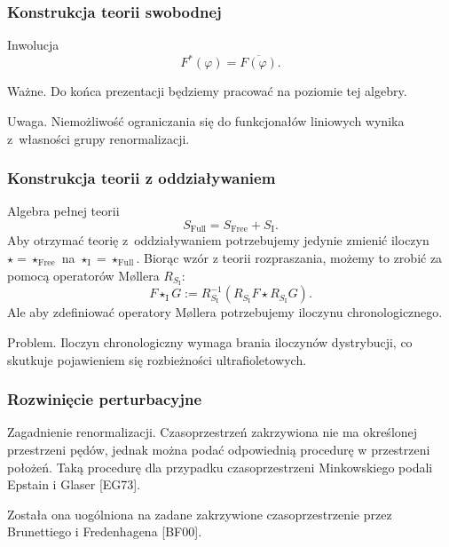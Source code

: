 \documentclass[10pt,t]{beamer}
\begin{document}
\begin{frame}
  \frametitle{Konstrukcja teorii swobodnej}


  Inwolucja
  \begin{equation}
    \label{eq:Rachunek-zaburzen-14}
    F^{ * }( \varphi ) = \overline{ F( \varphi ) }.
  \end{equation}

  Ważne. Do końca prezentacji będziemy pracować na poziomie tej algebry.

  Uwaga. Niemożliwość ograniczania się do funkcjonałów liniowych wynika
  z~własności grupy renormalizacji.

\end{frame}





\begin{frame}
  \frametitle{Konstrukcja teorii z oddziaływaniem}


  Algebra pełnej teorii
  \begin{equation}
    \label{eq:Rachunek-zaburzen-15}
    S_{ \textrm{Full} } = S_{ \textrm{Free} } + S_{ \textrm{I} }.
  \end{equation}
  Aby otrzymać teorię z~oddziaływaniem potrzebujemy jedynie zmienić
  iloczyn $\star = \star_{ \textrm{Free} }$ na
  $\star_{ \textrm{I} } = \star_{ \textrm{Full} }$. Biorąc wzór z teorii rozpraszania,
  możemy to zrobić za pomocą operatorów M\o llera $R_{ S_{ \textrm{I} } }$:
  \begin{equation}
    \label{eq:Rachunek-zaburzen-16}
    F \star_{ \textrm{I} } G :=
    R_{ S_{ \textrm{I} } }^{ -1 }( R_{ S_{ \textrm{I} } } F
    \star R_{ S_{ \textrm{I} } } G ).
  \end{equation}
  Ale aby zdefiniować operatory M\o llera potrzebujemy iloczynu
  chronologicznego.

  Problem. Iloczyn chronologiczny wymaga brania iloczynów dystrybucji,
  co skutkuje pojawieniem się rozbieżności ultrafioletowych.

\end{frame}





\begin{frame}
  \frametitle{Rozwinięcie perturbacyjne}


  Zagadnienie renormalizacji. Czasoprzestrzeń zakrzywiona nie ma określonej
  przestrzeni pędów, jednak można podać odpowiednią procedurę w przestrzeni
  położeń. Taką procedurę dla przypadku czasoprzestrzeni Minkowskiego podali
  Epstain i Glaser [EG73].

  Została ona uogólniona na zadane zakrzywione czasoprzestrzenie
  przez Brunettiego i Fredenhagena [BF00].

\end{frame}
\end{document}
